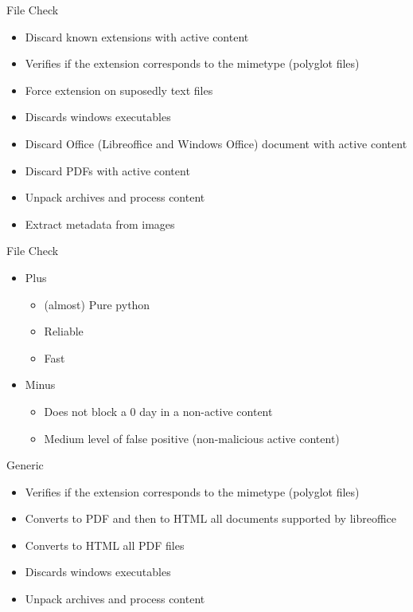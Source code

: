 \begin{frame}[fragile]{File Check}
    \begin{itemize}
        \item Discard known extensions with active content
        \item Verifies if the extension corresponds to the mimetype (polyglot files)
        \item Force extension on suposedly text files
        \item Discards windows executables
        \item Discard Office (Libreoffice and Windows Office) document with active content
        \item Discard PDFs with active content
        \item Unpack archives and process content
        \item Extract metadata from images
   \end{itemize}
\end{frame}

\begin{frame}[fragile]{File Check}
    \begin{itemize}
        \item Plus
        \begin{itemize}
            \item (almost) Pure python
            \item Reliable
            \item Fast
        \end{itemize}
        \item Minus
        \begin{itemize}
            \item Does not block a 0 day in a non-active content
            \item Medium level of false positive (non-malicious active content)
        \end{itemize}
   \end{itemize}
\end{frame}

\begin{frame}[fragile]{Generic}
    \begin{itemize}
        \item Verifies if the extension corresponds to the mimetype (polyglot files)
        \item Converts to PDF and then to HTML all documents supported by libreoffice
        \item Converts to HTML all PDF files
        \item Discards windows executables
        \item Unpack archives and process content
   \end{itemize}
\end{frame}

